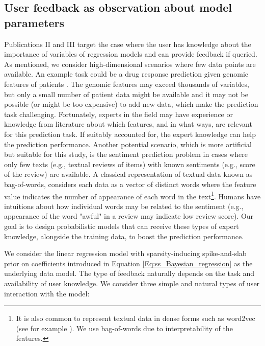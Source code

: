 \documentclass[dissertation,math,vertlayout,pdfa,colorlinks]{aaltoseries}
\begin{document}
\subsection{User feedback as observation about model parameters}\label{KE_models}

Publications II and III target the case where the user has knowledge about the importance of variables of regression models and can provide feedback if queried. As mentioned, we consider high-dimensional scenarios where few data points are available. An example task could be a drug response prediction given genomic features of patients \cite{drug_response_prediction}. The genomic features may exceed thousands of variables, but only a small number of patient data might be available and it may not be possible (or might be too expensive) to add new data, which make the prediction task challenging. Fortunately, experts in the field may have experience or knowledge from literature about which features, and in what ways, are relevant for this prediction task. If suitably accounted for, the expert knowledge can help the prediction performance. Another potential scenario, which is more artificial but suitable for this study, is the sentiment prediction problem \cite{liu2015sentiment} in cases where only few texts (e.g., textual reviews of items) with known sentiments (e.g., score of the review) are available. A classical representation of textual data known as bag-of-words, considers each data as a vector of distinct words where the feature value indicates the number of appearance of each word in the text\footnote{It is also common to represent textual data in dense forms such as word2vec (see for example \cite{dai2015semi}). We use bag-of-words due to interpretability of the features.}. Humans have intuitions about how individual words may be related to the sentiment (e.g., appearance of the word "awful" in a review may indicate low review score). Our goal is to design probabilistic models that can receive these types of expert knowledge, alongside the training data, to boost the prediction performance.  

We consider the linear regression model with sparsity-inducing spike-and-slab prior on coefficients introduced in Equation \ref{Eq:ss_Bayesian_regression} as the underlying data model. The type of feedback naturally depends on the task and availability of user knowledge. We consider three simple and natural types of user interaction with the model: 
\end{document}
